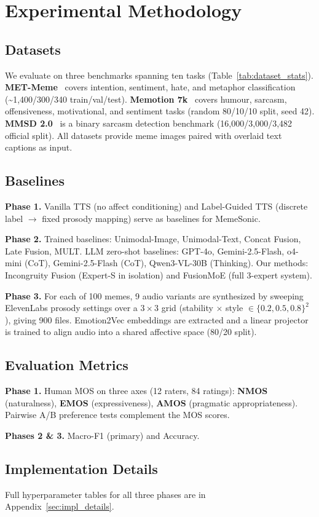 \section{Experimental Methodology}

\subsection{Datasets}

We evaluate on three benchmarks spanning ten tasks (Table~\ref{tab:dataset_stats}).
\textbf{MET-Meme}~\citep{metmeme} covers intention, sentiment, hate, and metaphor classification
(\textasciitilde1,400/300/340 train/val/test).
\textbf{Memotion 7k}~\citep{chhavi2020memotion} covers humour, sarcasm, offensiveness,
motivational, and sentiment tasks (random 80/10/10 split, seed 42).
\textbf{MMSD 2.0}~\citep{mmsd2} is a binary sarcasm detection benchmark
(16,000/3,000/3,482 official split).
All datasets provide meme images paired with overlaid text captions as input.

\subsection{Baselines}

\textbf{Phase 1.} Vanilla TTS (no affect conditioning) and Label-Guided TTS (discrete label
$\to$ fixed prosody mapping) serve as baselines for MemeSonic.

\textbf{Phase 2.} Trained baselines: Unimodal-Image, Unimodal-Text, Concat Fusion, Late Fusion,
MULT. LLM zero-shot baselines: GPT-4o, Gemini-2.5-Flash, o4-mini (CoT),
Gemini-2.5-Flash (CoT), Qwen3-VL-30B (Thinking). Our methods: Incongruity Fusion (Expert-S
in isolation) and FusionMoE (full 3-expert system).

\textbf{Phase 3.} For each of 100 memes, 9 audio variants are synthesized by sweeping ElevenLabs
prosody settings over a $3\times3$ grid (stability $\times$ style $\in \{0.2,0.5,0.8\}^2$),
giving 900 files. Emotion2Vec embeddings are extracted and a linear projector is trained
to align audio into a shared affective space (80/20 split).

\subsection{Evaluation Metrics}

\textbf{Phase 1.} Human MOS on three axes (12 raters, 84 ratings): \textbf{NMOS} (naturalness),
\textbf{EMOS} (expressiveness), \textbf{AMOS} (pragmatic appropriateness). Pairwise A/B
preference tests complement the MOS scores.

\textbf{Phases 2 \& 3.} Macro-F1 (primary) and Accuracy.

\subsection{Implementation Details}

Full hyperparameter tables for all three phases are in Appendix~\ref{sec:impl_details}.
